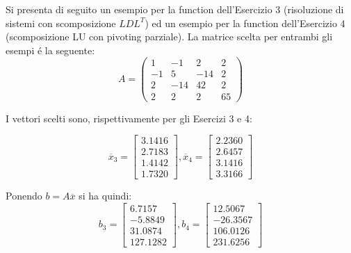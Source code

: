 
\begin{center}
\footnotesize\noindent{}\end{center}

\noindent Si presenta di seguito un esempio per la function dell'Esercizio 3 (risoluzione di sistemi con scomposizione \(LDL^T\)) ed un esempio per la function dell'Esercizio 4 (scomposizione LU con pivoting parziale). La matrice scelta per entrambi gli esempi \'e la seguente:
\[
A = \begin{pmatrix} 1 & -1 & 2 & 2 \\ -1 & 5 & -14 & 2\\ 2 & -14 & 42 & 2\\ 2 & 2 & 2 & 65 \end{pmatrix}
\]

\noindent I vettori scelti sono, rispettivamente per gli Esercizi 3 e 4:

\[
\overline{x}_3 = \begin{bmatrix} 3.1416 \\ 2.7183 \\ 1.4142 \\ 1.7320 \end{bmatrix},
\overline{x}_4 = \begin{bmatrix} 2.2360 \\ 2.6457 \\ 3.1416 \\ 3.3166 \end{bmatrix}
\]

\noindent Ponendo \(b=A\overline{x}\) si ha quindi:
\\
\[
b_3 = \begin{bmatrix} 6.7157 \\ -5.8849 \\ 31.0874 \\ 127.1282 \end{bmatrix},
b_4 = \begin{bmatrix} 12.5067 \\ -26.3567 \\ 106.0126 \\ 231.6256 \end{bmatrix}
\]

